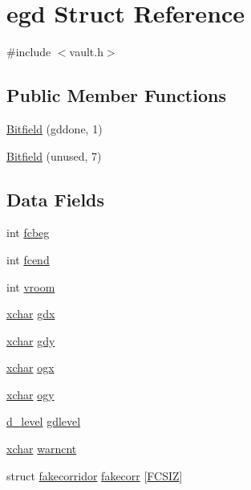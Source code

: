 \hypertarget{structegd}{\section{egd Struct Reference}
\label{structegd}
}


{\ttfamily \#include $<$vault.\+h$>$}

\subsection*{Public Member Functions}
\begin{DoxyCompactItemize}
\item 
\hyperlink{structegd_a23516170dd834cb22db722f071fde95f}{Bitfield} (gddone, 1)
\item 
\hyperlink{structegd_a882a17def0434248c795a5a6f1702097}{Bitfield} (unused, 7)
\end{DoxyCompactItemize}
\subsection*{Data Fields}
\begin{DoxyCompactItemize}
\item 
int \hyperlink{structegd_ac76b1fc679788ec57bf0a1daa904967f}{fcbeg}
\item 
int \hyperlink{structegd_a7dfd1430e95e480db2b8229ab842ff0f}{fcend}
\item 
int \hyperlink{structegd_a28b49224a9c6d896fc2302f3cf5fc9cf}{vroom}
\item 
\hyperlink{global_8h_a2043b7d01ce89f4ee2fa6c345a752d32}{xchar} \hyperlink{structegd_ac1a2fe4494596129ab2b4c077e4c2b4c}{gdx}
\item 
\hyperlink{global_8h_a2043b7d01ce89f4ee2fa6c345a752d32}{xchar} \hyperlink{structegd_a30c8a3ece31c1b1459f7cdae076ec97e}{gdy}
\item 
\hyperlink{global_8h_a2043b7d01ce89f4ee2fa6c345a752d32}{xchar} \hyperlink{structegd_a87fb943de89433c04a2e66fe7d4a75d3}{ogx}
\item 
\hyperlink{global_8h_a2043b7d01ce89f4ee2fa6c345a752d32}{xchar} \hyperlink{structegd_aaceb7f37f78271231d109e31bd144bd0}{ogy}
\item 
\hyperlink{structd__level}{d\+\_\+level} \hyperlink{structegd_a47d146b6474b8554aa3150fd7ae3c03f}{gdlevel}
\item 
\hyperlink{global_8h_a2043b7d01ce89f4ee2fa6c345a752d32}{xchar} \hyperlink{structegd_af76108308738faac83e3272e2512df58}{warncnt}
\item 
struct \hyperlink{structfakecorridor}{fakecorridor} \hyperlink{structegd_a51c5cab16c8ac5201cd2161904ba8279}{fakecorr} \mbox{[}\hyperlink{vault_8h_a6bec22fb49434cd3ad5510fbb259a0b6}{F\+C\+S\+I\+Z}\mbox{]}
\end{DoxyCompactItemize}


